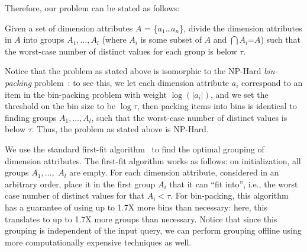 Therefore, our problem can be stated as follows:
\begin{problem}
Given a set of dimension attributes $A$ = \{$a_1$\ldots$a_n$\}, divide the
dimension attributes in $A$ into groups $A_1, \ldots, A_l$ (where $A_i$ is some
subset of $A$ and $\bigcap A_i$=$A$) such that the worst-case number of distinct values
for each group is below $\tau$.
\vspace{-5pt}
\end{problem}
Notice that the problem as stated above is isomorphic to the NP-Hard
{\em bin-packing} problem~\cite{garey}: to see this, we let each dimension attribute
$a_i$ correspond to an item in the bin-packing problem with weight $\log (|a_i|)$,
and we set the threshold on the bin size to be $\log \tau$,
then packing items into bins is identical to finding groups $A_1, \ldots, A_l$,
such that the worst-case number of distinct values is below $\tau$.
Thus, the problem as stated above is NP-Hard.

We use the standard first-fit algorithm~\cite{first-fit} to find the optimal
grouping of dimension attributes.
The first-fit algorithm works as follows:
on initialization, all groups $A_1, \ldots, $ $A_l$ are empty.
  For each dimension attribute, considered in an arbitrary order, place it in the first group
  $A_i$ that it can ``fit into'', i.e., the worst case
  number of distinct values for that $A_i < \tau$.
  For bin-packing, this algorithm has a guarantee of using up to 1.7X more 
  bins than necessary: here, this translates to up to 1.7X more groups than necessary.
Notice that since this grouping is independent of the input query, we can
perform grouping offline using more computationally expensive techniques as
well.


  
